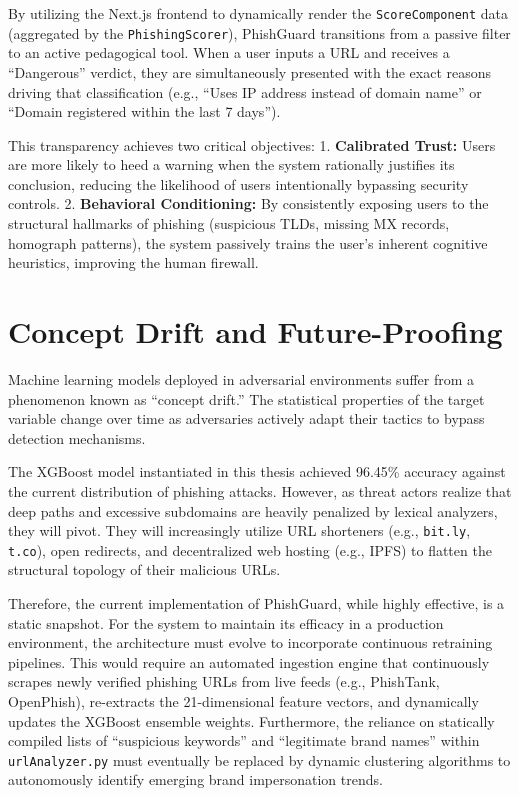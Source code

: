 By utilizing the Next.js frontend to dynamically render the
\texttt{ScoreComponent} data (aggregated by the
\texttt{PhishingScorer}), PhishGuard transitions from a passive filter
to an active pedagogical tool. When a user inputs a URL and receives a
``Dangerous'' verdict, they are simultaneously presented with the exact
reasons driving that classification (e.g., ``Uses IP address instead of
domain name'' or ``Domain registered within the last 7 days'').

This transparency achieves two critical objectives: 1.
\textbf{Calibrated Trust:} Users are more likely to heed a warning when
the system rationally justifies its conclusion, reducing the likelihood
of users intentionally bypassing security controls. 2.
\textbf{Behavioral Conditioning:} By consistently exposing users to the
structural hallmarks of phishing (suspicious TLDs, missing MX records,
homograph patterns), the system passively trains the user's inherent
cognitive heuristics, improving the human firewall.

\section{Concept Drift and
Future-Proofing}\label{concept-drift-and-future-proofing}

Machine learning models deployed in adversarial environments suffer from
a phenomenon known as ``concept drift.'' The statistical properties of
the target variable change over time as adversaries actively adapt their
tactics to bypass detection mechanisms.

The XGBoost model instantiated in this thesis achieved 96.45\% accuracy
against the current distribution of phishing attacks. However, as threat
actors realize that deep paths and excessive subdomains are heavily
penalized by lexical analyzers, they will pivot. They will increasingly
utilize URL shorteners (e.g., \texttt{bit.ly}, \texttt{t.co}), open
redirects, and decentralized web hosting (e.g., IPFS) to flatten the
structural topology of their malicious URLs.

Therefore, the current implementation of PhishGuard, while highly
effective, is a static snapshot. For the system to maintain its efficacy
in a production environment, the architecture must evolve to incorporate
continuous retraining pipelines. This would require an automated
ingestion engine that continuously scrapes newly verified phishing URLs
from live feeds (e.g., PhishTank, OpenPhish), re-extracts the
21-dimensional feature vectors, and dynamically updates the XGBoost
ensemble weights. Furthermore, the reliance on statically compiled lists
of ``suspicious keywords'' and ``legitimate brand names'' within
\texttt{urlAnalyzer.py} must eventually be replaced by dynamic
clustering algorithms to autonomously identify emerging brand
impersonation trends. 

